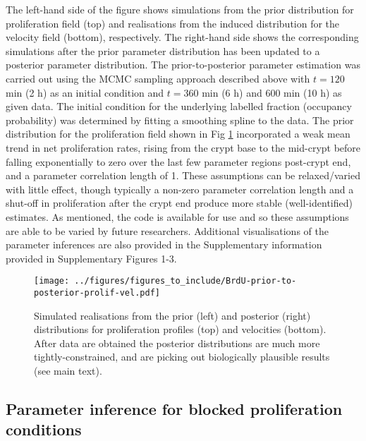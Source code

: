 \documentclass[10pt,letterpaper]{article}
\providecommand{\DIFaddtex}[1]{{\protect\color{blue} \sf #1}} %
\providecommand{\DIFdeltex}[1]{{\protect\color{red} \scriptsize #1}} %
\providecommand{\DIFaddbegin}{} %
\providecommand{\DIFaddend}{} %
\providecommand{\DIFdelbegin}{} %
\providecommand{\DIFdelend}{} %
\providecommand{\DIFadd}[1]{\texorpdfstring{\DIFaddtex{#1}}{#1}} %
\providecommand{\DIFdel}[1]{\texorpdfstring{\DIFdeltex{#1}}{}} %
\begin{document}
\DIFaddend The left-hand side of the figure shows simulations from the prior
distribution for proliferation field (top) and realisations from the
induced distribution for the velocity field (bottom), respectively. The
right-hand side shows the corresponding simulations after the prior
parameter distribution has been updated to a posterior parameter
distribution. The prior-to-posterior parameter estimation was carried
out using the MCMC sampling approach described above with \(t = 120\)
min (2 h) as an initial condition and \(t = 360\) min (6 h) and \(600\)
min (10 h) as given data. The initial condition for the underlying
labelled fraction \DIFaddbegin \DIFadd{(occupancy probability) }\DIFaddend was determined by fitting a
smoothing spline to the data. The prior distribution for the
proliferation field shown in Fig
\ref{fig:BrdU-prior-to-posterior-prolif-vel} incorporated a weak mean
trend in net proliferation rates, rising from the crypt base to the
mid-crypt before falling exponentially to zero over the last few
parameter regions post-crypt end, and a parameter correlation length of
1. These assumptions can be relaxed/varied with little effect, though
typically a non-zero parameter correlation length and a shut-off in
proliferation after the crypt end produce more stable (well-identified)
estimates. \DIFdelbegin \DIFdel{As mentioned, the code is available for use and so these
assumptions are able to be varied by future researchers. }\DIFdelend Additional visualisations of the parameter inferences are
\DIFdelbegin \DIFdel{also provided in the
Supplementary information}\DIFdelend \DIFaddbegin \DIFadd{provided in Supplementary Figures 1-3}\DIFaddend .

\begin{figure}
\centering
\texttt{[image: ../figures/figures\_to\_include/BrdU-prior-to-posterior-prolif-vel.pdf]}
\caption{Simulated realisations from the prior (left) and posterior
(right) distributions for proliferation profiles (top) and velocities
(bottom). After data are obtained the posterior distributions are much
more tightly-constrained, and are picking out biologically plausible
results (see main text).\label{fig:BrdU-prior-to-posterior-prolif-vel}}
\end{figure}

\subsection{Parameter inference for blocked proliferation
conditions}\label{parameter-inference-for-blocked-proliferation-conditions}
\end{document}
